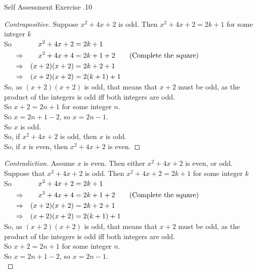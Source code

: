 \documentclass[../notes.tex]{subfiles}
\begin{document}
\begin{exercise}{Self Assessment Exercise \thechapter.10}
\begin{enumerate}
\begin{enumerate}[label=(\alph*)]
\begin{proof}[Contrapositive]
										Suppose $x^{2} + 4x + 2$ is odd. Then $x^{2} + 4x + 2 = 2k + 1$ for some integer $k$\\
										So $\begin{alignedat}[t]{2}
											& & x^{2} + 4x + 2 &= 2k + 1\\
											& \Rightarrow \quad & x^{2} + 4x + 4 &= 2k + 1 + 2 \qquad \text{(Complete the square)}\\
											& \Rightarrow \quad & (x + 2)(x + 2) &= 2k + 2 + 1\\
											& \Rightarrow \quad & (x + 2)(x + 2) &= 2(k + 1) + 1
										\end{alignedat}$\\
										So, as $(x + 2)(x + 2)$ is odd, that means that $x + 2$ must be odd, as the product of the integers is odd iff both integers are odd.\\
										So $x + 2 = 2n + 1$ for some integer $n$.\\
										So $x = 2n + 1 - 2$, so $x = 2n - 1$.\\
										So $x$ is odd.\\
										So, if $x^{2} + 4x + 2$ is odd, then $x$ is odd.\\
										So, if $x$ is even, then $x^{2} + 4x + 2$ is even.
									\end{proof}
									\pagebreak
									\begin{proof}[Contradiction]
										Assume $x$ is even. Then either $x^{2} + 4x + 2$ is even, or odd.\\
										Suppose that $x^{2} + 4x + 2$ is odd. Then $x^{2} + 4x + 2 = 2k + 1$ for some integer $k$\\
										So $\begin{alignedat}[t]{2}
											& & x^{2} + 4x + 2 &= 2k + 1\\
											& \Rightarrow \quad & x^{2} + 4x + 4 &= 2k + 1 + 2 \qquad \text{(Complete the square)}\\
											& \Rightarrow \quad & (x + 2)(x + 2) &= 2k + 2 + 1\\
											& \Rightarrow \quad & (x + 2)(x + 2) &= 2(k + 1) + 1
										\end{alignedat}$\\
										So, as $(x + 2)(x + 2)$ is odd, that means that $x + 2$ must be odd, as the product of the integers is odd iff both integers are odd.\\
										So $x + 2 = 2n + 1$ for some integer $n$.\\
										So $x = 2n + 1 - 2$, so $x = 2n - 1$.\\

\end{proof}
\end{enumerate}
\end{enumerate}
\end{exercise}
\end{document}
